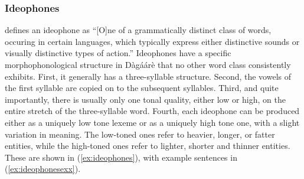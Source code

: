 \subsubsection{Ideophones}
\citet[131--132]{Trask1993} defines an ideophone as ``[O]ne of a grammatically distinct
class of words, occuring in certain languages, which typically express either distinctive
sounds or visually distinctive types of action.'' Ideophones have a specific morphophonological structure in Dàgáárè that no other word class consistently exhibits.
First, it generally has a three-syllable structure. Second, the vowels of the first syllable are
copied on to the subsequent syllables. Third, and quite importantly, there is usually only one
tonal quality, either low or high, on the entire stretch of the three-syllable word. Fourth, each
ideophone can be produced either as a uniquely low tone lexeme or as a uniquely high tone
one, with a slight variation in meaning. The low-toned ones refer to heavier, longer, or fatter
entities, while the high-toned ones refer to lighter, shorter and thinner entities. These are
shown in (\ref{ex:ideophones}), with example sentences in (\ref{ex:ideophonesexx}).




